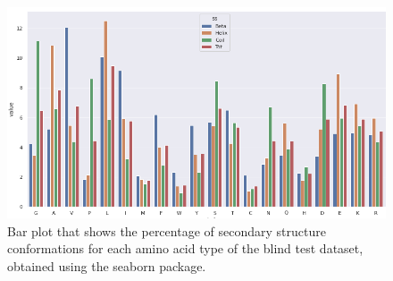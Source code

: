 \documentclass[nocrop]{bioinfo}
\begin{document}
\begin{supplementary}
\begin{figure}[!h]
\begin{minipage}{0.5\textwidth}
    \end{minipage}
\end{figure}
\vspace{-20pt}
\begin{figure}[!h]
\centering
\captionsetup{}
\includegraphics[scale=0.35]{./plotsJPred4/ss_per_aa_composition_blind.png}
\caption{Bar plot that shows the percentage of secondary structure conformations for each amino acid type of the blind test dataset, obtained using the seaborn package.}
\end{figure}


\end{supplementary}
\end{document}
